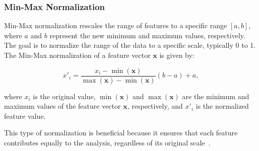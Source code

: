 \subsubsection{Min-Max Normalization}\label{subsec:min-max}
Min-Max normalization rescales the range of features to a specific range $[a, b]$, where $a$ and $b$ represent the new minimum and maximum values, respectively.
The goal is to normalize the range of the data to a specific scale, typically 0 to 1.
The Min-Max normalization of a feature vector $\mathbf{x}$ is given by:

$$
x'_i = \frac{x_i - \min(\mathbf{x})}{\max(\mathbf{x}) - \min(\mathbf{x})}(b - a) + a,
$$

where $x_i$ is the original value, $\min(\mathbf{x})$ and $\max(\mathbf{x})$ are the minimum and maximum values of the feature vector $\mathbf{x}$, respectively, and $x'_i$ is the normalized feature value.

This type of normalization is beneficial because it ensures that each feature contributes equally to the analysis, regardless of its original scale~\cite{dataminingConcepts}.